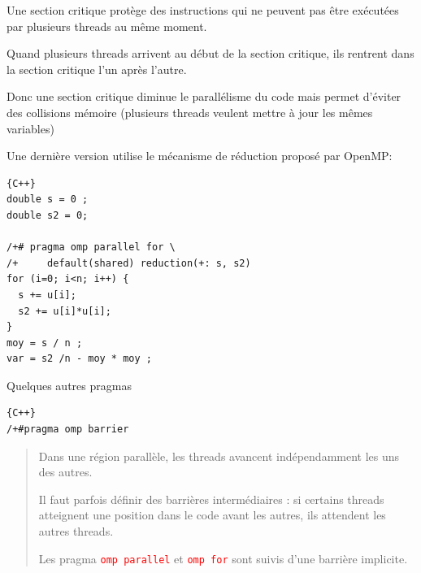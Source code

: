 \documentclass{beamer}
\begin{document}
\begin{frame}
	Une section critique protège des instructions qui ne peuvent pas être exécutées par plusieurs threads au même moment.
	
	\bigskip
	Quand plusieurs threads arrivent au début de la section critique, ils rentrent dans la section critique l'un après l'autre. 
	
	\bigskip
	Donc une section critique diminue le parallélisme du code mais permet d'éviter des collisions mémoire (plusieurs threads veulent mettre à jour les mêmes variables)
\end{frame}

\begin{frame}[fragile]
Une dernière version utilise le mécanisme de réduction proposé par OpenMP:

\begin{lstlisting}{C++}
double s = 0 ;
double s2 = 0;

/+# pragma omp parallel for \
/+     default(shared) reduction(+: s, s2)
for (i=0; i<n; i++) {
  s += u[i];
  s2 += u[i]*u[i];
}
moy = s / n ; 
var = s2 /n - moy * moy ;
\end{lstlisting}
\end{frame}

\begin{frame}[fragile]
Quelques autres pragmas

\begin{lstlisting}{C++}
/+#pragma omp barrier
\end{lstlisting}

\begin{quote}
	Dans une région parallèle, les threads avancent indé\-pen\-dam\-ment les uns des autres. 
	
	Il faut parfois définir des barrières intermédiaires : si certains threads atteignent une position dans le code avant les autres, ils attendent les autres threads.
	
	Les pragma \textcolor{red}{\tt omp parallel} et  \textcolor{red}{\tt omp for} sont suivis d'une barrière implicite.
\end{quote}
\vfill

\end{frame}
\end{document}
